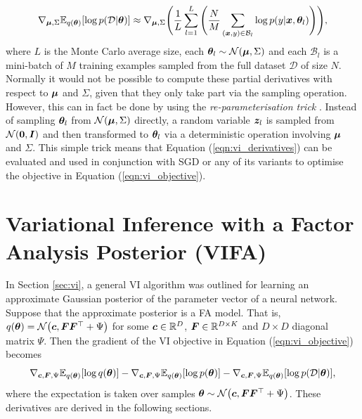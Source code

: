 \documentclass[10pt]{article} %
\begin{document}
\begin{equation}\label{eqn:vi_derivatives}
	 \nabla_{{\bm{\mu}}, \Sigma} \mathbb{E}_{q({\bm{\theta}})} [\log p(\mathcal{D} | {\bm{\theta}})]
	\approx \nabla_{{\bm{\mu}}, \Sigma} \Bigg(\frac{1}{L}  \sum_{l=1}^{L} \Bigg( \frac{N}{M} \sum_{({\bm{x}}, y) \in \mathcal{B}_l} \log p(y | {\bm{x}}, {\bm{\theta}}_l) \Bigg)\Bigg),
\end{equation}
where $L$ is the Monte Carlo average size, each ${\bm{\theta}}_l \sim \mathcal{N}({\bm{\mu}}, \Sigma)$ and each $\mathcal{B}_l$ is a mini-batch of $M$ training examples sampled from the full dataset $\mathcal{D}$ of size $N$. Normally it would not be possible to compute these partial derivatives with respect to ${\bm{\mu}}$ and $\Sigma$, given that they only take part via the sampling operation. However, this can in fact be done by using the \emph{re-parameterisation trick} \citep{goodfellow2016}. Instead of sampling ${\bm{\theta}}_l$ from $\mathcal{N}({\bm{\mu}}, \Sigma)$ directly, a random variable ${\bm{z}}_l$ is sampled from $\mathcal{N}(\mathbf{0}, {\bm{I}})$ and then transformed to ${\bm{\theta}}_l$ via a deterministic operation involving ${\bm{\mu}}$ and $\Sigma$. This simple trick means that Equation (\ref{eqn:vi_derivatives}) can be evaluated and used in conjunction with SGD or any of its variants to optimise the objective in Equation (\ref{eqn:vi_objective}).

\section{Variational Inference with a Factor Analysis Posterior (VIFA)}

In Section \ref{sec:vi}, a general VI algorithm was outlined for learning an approximate Gaussian posterior of the parameter vector of a neural network. Suppose that the approximate posterior is a FA model. That is, $q({\bm{\theta}}) = \mathcal{N}\big({\bm{c}}, {\bm{F}} {\bm{F}}^{\top} + \Psi\big)$ for some ${\bm{c}} \in \mathbb{R}^D$, ${\bm{F}} \in \mathbb{R}^{D \times K}$ and $D \times D$ diagonal matrix $\Psi$. Then the gradient of the VI objective in Equation (\ref{eqn:vi_objective}) becomes 
\begin{equation}\label{eqn:vi_fa_derivatives}
	\nabla_{{\bm{c}}, {\bm{F}}, \Psi} \mathbb{E}_{q({\bm{\theta}})} [\log q({\bm{\theta}})]
	- \nabla_{{\bm{c}}, {\bm{F}}, \Psi} \mathbb{E}_{q({\bm{\theta}})} [\log p({\bm{\theta}})]
	-  \nabla_{{\bm{c}}, {\bm{F}}, \Psi} \mathbb{E}_{q({\bm{\theta}})} [\log p(\mathcal{D} | {\bm{\theta}})],
\end{equation}
where the expectation is taken over samples ${\bm{\theta}} \sim \mathcal{N}\big({\bm{c}}, {\bm{F}} {\bm{F}}^{\top} + \Psi\big)$. These derivatives are derived in the following sections. 
\end{document}
